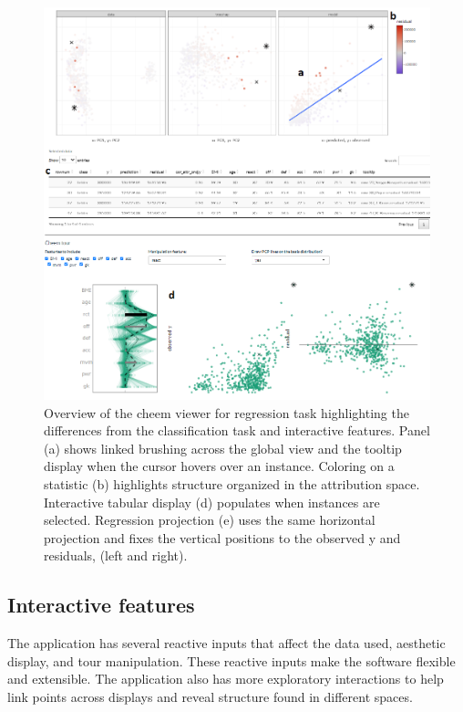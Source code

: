 \documentclass[
]{article}
\begin{document}
\begin{figure}

{\centering \includegraphics[width=1\linewidth]{./figures/app_regression_interactions} 

}

\caption{Overview of the cheem viewer for regression task highlighting the differences from the classification task and interactive features. Panel (a) shows linked brushing across the global view and the tooltip display when the cursor hovers over an instance. Coloring on a statistic (b) highlights structure organized in the attribution space. Interactive tabular display (d) populates when instances are selected. Regression projection (e) uses the same horizontal projection and fixes the vertical positions to the observed y and residuals, (left and right).}\label{fig:regressioncase}
\end{figure}

\hypertarget{interactive-features}{%
\subsection{Interactive features}\label{interactive-features}}

The application has several reactive inputs that affect the data used, aesthetic display, and tour manipulation. These reactive inputs make the software flexible and extensible. The application also has more exploratory interactions to help link points across displays and reveal structure found in different spaces.
\end{document}
